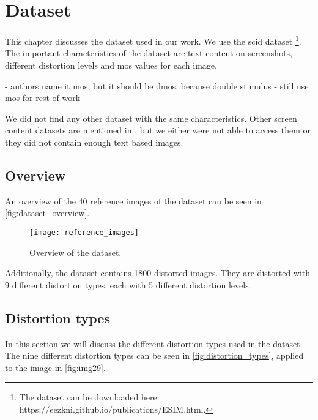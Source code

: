 \chapter{Dataset}
\label{ch:dataset}
This chapter discusses the dataset used in our work. We use the \gls{scid} dataset \cite{ni_esim_2017}\footnote{The dataset can be downloaded here: https://eezkni.github.io/publications/ESIM.html.}.
The important characteristics of the dataset are text content on screenshots, different distortion levels and \gls{mos} values for each image.

- authors name it mos, but it should be dmos, because double stimulus \cite{mos_dmos_1993}
- still use mos for rest of work

We did not find any other dataset with the same characteristics.
Other screen content datasets are mentioned in \cite{iqa_survey_2020}, but we either were not able to access them or they did not contain enough text based images.

\section{Overview}
\label{sec:dataset_overview}
An overview of the 40 reference images of the dataset can be seen in \autoref{fig:dataset_overview}.

\begin{figure}[h]
    \centering
    \texttt{[image: reference\_images]}
    \caption{Overview of the dataset.}
    \label{fig:dataset_overview}
\end{figure}

Additionally, the dataset contains 1800 distorted images.
They are distorted with 9 different distortion types, each with 5 different distortion levels.

\section{Distortion types}
\label{sec:dataset_distortion_types}

In this section we will discuss the different distortion types used in the dataset.
The nine different distortion types can be seen in \autoref{fig:distortion_types}, applied to the image in \autoref{fig:img29}.

